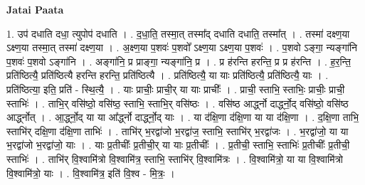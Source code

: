 \documentclass[17pt]{extarticle}
\begin{document}
\textbf{Jatai Paata} \newline

1. उप॑ दधाति दधा॒ त्युपोप॑ दधाति । . द॒धा॒ति॒ तस्मा॒त् तस्मा᳚द् दधाति दधाति॒ तस्मा᳚त् । . तस्मा॑ दक्ष्ण॒या ऽक्ष्ण॒या तस्मा॒त् तस्मा॑ दक्ष्ण॒या । . अ॒क्ष्ण॒या प॒शवः॑ प॒शवो᳚ ऽक्ष्ण॒या ऽक्ष्ण॒या प॒शवः॑ । . प॒शवो ऽङ्गा॒ न्यङ्गा॑नि प॒शवः॑ प॒शवो ऽङ्गा॑नि । . अङ्गा॑नि॒ प्र प्राङ्गा॒ न्यङ्गा॑नि॒ प्र । . प्र ह॑रन्ति हरन्ति॒ प्र प्र ह॑रन्ति । . ह॒र॒न्ति॒ प्रति॑ष्ठित्यै॒ प्रति॑ष्ठित्यै हरन्ति हरन्ति॒ प्रति॑ष्ठित्यै । . प्रति॑ष्ठित्यै॒ या याः प्रति॑ष्ठित्यै॒ प्रति॑ष्ठित्यै॒ याः । . प्रति॑ष्ठित्या॒ इति॒ प्रति॑ - स्थि॒त्यै॒ । . याः प्राचीः॒ प्राची॒र् या याः प्राचीः᳚ । . प्राची॒ स्ताभि॒ स्ताभिः॒ प्राचीः॒ प्राची॒ स्ताभिः॑ । . ताभि॒र् वसि॑ष्ठो॒ वसि॑ष्ठ॒ स्ताभि॒ स्ताभि॒र् वसि॑ष्ठः । . वसि॑ष्ठ आर्द्ध्नो दार्द्ध्नो॒द् वसि॑ष्ठो॒ वसि॑ष्ठ आर्द्ध्नोत् । . आ॒र्द्ध्नो॒द् या या आ᳚र्द्ध्नो दार्द्ध्नो॒द् याः । . या द॑क्षि॒णा द॑क्षि॒णा या या द॑क्षि॒णा । . द॒क्षि॒णा ताभि॒ स्ताभि॑र् दक्षि॒णा द॑क्षि॒णा ताभिः॑ । . ताभि॑र् भ॒रद्वा॑जो भ॒रद्वा॑ज॒ स्ताभि॒ स्ताभि॑र् भ॒रद्वा॑जः । . भ॒रद्वा॑जो॒ या या भ॒रद्वा॑जो भ॒रद्वा॑जो॒ याः । . याः प्र॒तीचीः᳚ प्र॒तीची॒र् या याः प्र॒तीचीः᳚ । . प्र॒तीची॒ स्ताभि॒ स्ताभिः॑ प्र॒तीचीः᳚ प्र॒तीची॒ स्ताभिः॑ । . ताभि॑र् वि॒श्वामि॑त्रो वि॒श्वामि॑त्र॒ स्ताभि॒ स्ताभि॑र् वि॒श्वामि॑त्रः । . वि॒श्वामि॑त्रो॒ या या वि॒श्वामि॑त्रो वि॒श्वामि॑त्रो॒ याः । . वि॒श्वामि॑त्र॒ इति॑ वि॒श्व - मि॒त्रः॒ । \newline
\end{document}
